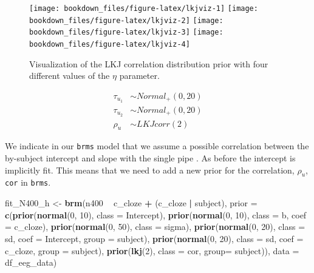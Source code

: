 \documentclass[12pt,]{krantz}
\newenvironment{Shaded}{\begin{snugshade}}{\end{snugshade}}
\newcommand{\DataTypeTok}[1]{\textcolor[rgb]{0.13,0.29,0.53}{#1}}
\newcommand{\DecValTok}[1]{\textcolor[rgb]{0.00,0.00,0.81}{#1}}
\newcommand{\KeywordTok}[1]{\textcolor[rgb]{0.13,0.29,0.53}{\textbf{#1}}}
\newcommand{\NormalTok}[1]{#1}
\newcommand{\OperatorTok}[1]{\textcolor[rgb]{0.81,0.36,0.00}{\textbf{#1}}}
\newcommand{\StringTok}[1]{\textcolor[rgb]{0.31,0.60,0.02}{#1}}
\theoremstyle{definition}
\theoremstyle{definition}
\theoremstyle{definition}
\theoremstyle{remark}
\begin{document}
\begin{figure}
\texttt{[image: bookdown\_files/figure-latex/lkjviz-1]} \texttt{[image: bookdown\_files/figure-latex/lkjviz-2]} \texttt{[image: bookdown\_files/figure-latex/lkjviz-3]} \texttt{[image: bookdown\_files/figure-latex/lkjviz-4]} \caption{Visualization of the LKJ correlation distribution prior with four different values of the \(\eta\) parameter.}\label{fig:lkjviz}
\end{figure}

\begin{equation}
\begin{aligned}
\tau_{u_1} &\sim Normal_+(0,20)\\
\tau_{u_2} &\sim Normal_+(0,20)\\
\rho_u &\sim LKJcorr(2) 
\end{aligned}
\end{equation}

We indicate in our \texttt{brms} model that we assume a possible correlation between the by-subject intercept and slope with the single pipe \texttt{\textbar{}}. As before the intercept is implicitly fit. This means that we need to add a new prior for the correlation, \(\rho_{u}\), \texttt{cor} in \texttt{brms}.

\begin{Shaded}
\begin{Highlighting}[]
\NormalTok{fit_N400_h <-}\StringTok{ }\KeywordTok{brm}\NormalTok{(n400 }\OperatorTok{~}\StringTok{ }\NormalTok{c_cloze }\OperatorTok{+}\StringTok{ }\NormalTok{(c_cloze }\OperatorTok{|}\StringTok{ }\NormalTok{subject),}
                  \DataTypeTok{prior =}
                      \KeywordTok{c}\NormalTok{(}\KeywordTok{prior}\NormalTok{(}\KeywordTok{normal}\NormalTok{(}\DecValTok{0}\NormalTok{, }\DecValTok{10}\NormalTok{), }\DataTypeTok{class =}\NormalTok{ Intercept),}
                        \KeywordTok{prior}\NormalTok{(}\KeywordTok{normal}\NormalTok{(}\DecValTok{0}\NormalTok{, }\DecValTok{10}\NormalTok{), }\DataTypeTok{class =}\NormalTok{ b, }\DataTypeTok{coef =}\NormalTok{ c_cloze),}
                        \KeywordTok{prior}\NormalTok{(}\KeywordTok{normal}\NormalTok{(}\DecValTok{0}\NormalTok{, }\DecValTok{50}\NormalTok{), }\DataTypeTok{class =}\NormalTok{ sigma),}
                        \KeywordTok{prior}\NormalTok{(}\KeywordTok{normal}\NormalTok{(}\DecValTok{0}\NormalTok{, }\DecValTok{20}\NormalTok{), }\DataTypeTok{class =}\NormalTok{ sd, }\DataTypeTok{coef =}\NormalTok{ Intercept, }\DataTypeTok{group =}\NormalTok{ subject),}
                        \KeywordTok{prior}\NormalTok{(}\KeywordTok{normal}\NormalTok{(}\DecValTok{0}\NormalTok{, }\DecValTok{20}\NormalTok{), }\DataTypeTok{class =}\NormalTok{ sd, }\DataTypeTok{coef =}\NormalTok{ c_cloze, }\DataTypeTok{group =}\NormalTok{ subject),}
                        \KeywordTok{prior}\NormalTok{(}\KeywordTok{lkj}\NormalTok{(}\DecValTok{2}\NormalTok{), }\DataTypeTok{class =}\NormalTok{ cor, }\DataTypeTok{group=}\NormalTok{ subject)),}
              \DataTypeTok{data =}\NormalTok{ df_eeg_data)}
\end{Highlighting}
\end{Shaded}
\end{document}
